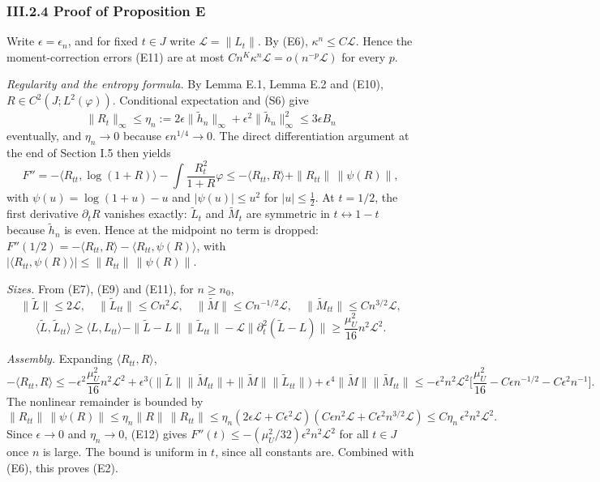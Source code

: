 \documentclass[
  british,
  10pt,
]{article}
\begin{document}
\subsubsection{III.2.4 Proof of Proposition
E}\label{iii.2.4-proof-of-proposition-e}

Write \(\epsilon=\epsilon_n\), and for fixed \(t\in J\) write
\(\mathcal L=\|L_t\|\). By (E6), \(\kappa^n\le C\mathcal L\). Hence the
moment-correction errors (E11) are at most
\(Cn^K\kappa^n\mathcal L=o(n^{-p}\mathcal L)\) for every \(p\).

\emph{Regularity and the entropy formula.} By Lemma E.1, Lemma E.2 and
(E10), \(R\in C^2(J;L^2(\varphi))\). Conditional expectation and (S6)
give \[
\|R_t\|_\infty\le\eta_n:=2\epsilon\|\widetilde h_n\|_\infty+\epsilon^2\|\widetilde h_n\|_\infty^2\le3\epsilon B_n
\] eventually, and \(\eta_n\to0\) because \(\epsilon n^{1/4}\to0\). The
direct differentiation argument at the end of Section I.5 then yields \[
F''=-\langle R_{tt},\log(1+R)\rangle-\int\frac{R_t^2}{1+R}\varphi
\le-\langle R_{tt},R\rangle+\|R_{tt}\|\,\|\psi(R)\|,
\tag{E12}
\] with \(\psi(u)=\log(1+u)-u\) and \(|\psi(u)|\le u^2\) for
\(|u|\le\frac12\). At \(t=1/2\), the first derivative \(\partial_tR\)
vanishes exactly: \(\widetilde L_t\) and \(\widetilde M_t\) are
symmetric in \(t\leftrightarrow1-t\) because \(\widetilde h_n\) is even.
Hence at the midpoint no term is dropped:
\(F''(1/2)=-\langle R_{tt},R\rangle-\langle R_{tt},\psi(R)\rangle\),
with \(|\langle R_{tt},\psi(R)\rangle|\le\|R_{tt}\|\,\|\psi(R)\|\).

\emph{Sizes.} From (E7), (E9) and (E11), for \(n\ge n_0\), \[
\|\widetilde L\|\le2\mathcal L,\quad
\|\widetilde L_{tt}\|\le Cn^2\mathcal L,\quad
\|\widetilde M\|\le Cn^{-1/2}\mathcal L,\quad
\|\widetilde M_{tt}\|\le Cn^{3/2}\mathcal L,
\] \[
\langle\widetilde L,\widetilde L_{tt}\rangle\ge\langle L,L_{tt}\rangle-\|\widetilde L-L\|\|\widetilde L_{tt}\|-\mathcal L\|\partial_t^2(\widetilde L-L)\|
\ge\frac{\mu_U^2}{16}n^2\mathcal L^2 .
\]

\emph{Assembly.} Expanding \(\langle R_{tt},R\rangle\), \[
-\langle R_{tt},R\rangle
\le-\epsilon^2\frac{\mu_U^2}{16}n^2\mathcal L^2
+\epsilon^3\big(\|\widetilde L\|\|\widetilde M_{tt}\|+\|\widetilde M\|\|\widetilde L_{tt}\|\big)
+\epsilon^4\|\widetilde M\|\|\widetilde M_{tt}\|
\le-\epsilon^2n^2\mathcal L^2\Big[\frac{\mu_U^2}{16}-C\epsilon n^{-1/2}-C\epsilon^2n^{-1}\Big].
\] The nonlinear remainder is bounded by \[
\|R_{tt}\|\,\|\psi(R)\|\le\eta_n\|R\|\,\|R_{tt}\|
\le\eta_n(2\epsilon\mathcal L+C\epsilon^2\mathcal L)(C\epsilon n^2\mathcal L+C\epsilon^2n^{3/2}\mathcal L)
\le C\eta_n\,\epsilon^2n^2\mathcal L^2 .
\] Since \(\epsilon\to0\) and \(\eta_n\to0\), (E12) gives
\(F''(t)\le-(\mu_U^2/32)\epsilon^2n^2\mathcal L^2\) for all \(t\in J\)
once \(n\) is large. The bound is uniform in \(t\), since all constants
are. Combined with (E6), this proves (E2).
\end{document}
